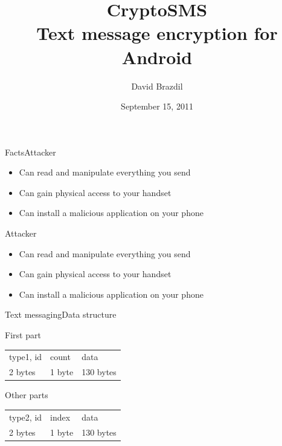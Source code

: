 \documentclass{beamer}
\title[CryptoSMS]{CryptoSMS\\Text message encryption for Android}
\author{David Brazdil}
\institute{University of Cambridge}
\date{September 15, 2011}
\newcommand{\txtFacts}{Facts}
\newcommand{\txtTextMessaging}{Text messaging}
\begin{document}
%

\begin{frame}
	\titlepage
\end{frame}


\begin{frame}{\txtFacts}{Attacker}
	\begin{itemize}
		\pause \item{Can read and manipulate everything you send}
		\pause \item{Can gain physical access to your handset}
		\pause \item{Can install a malicious application on your phone}
	\end{itemize}
\end{frame}



\begin{frame}{Attacker}
	\begin{itemize}
		\pause \item{Can read and manipulate everything you send}
		\pause \item{Can gain physical access to your handset}
		\pause \item{Can install a malicious application on your phone}
	\end{itemize}
\end{frame}

\begin{frame}{\txtTextMessaging}{Data structure}

   \begin{block}{First part}
	\begin{tabularx}{\textwidth}{ |l|l|L| }
		\hline
		type1, id  & count   & data \\
		2 bytes     & 1 byte  & 130 bytes  \\
		\hline
	\end{tabularx}
   \end{block}

   \begin{block}{Other parts}
	\begin{tabularx}{\textwidth}{ |l|l|L| }
		\hline
		type2, id  & index   & data \\
		2 bytes     & 1 byte  & 130 bytes  \\
		\hline
	\end{tabularx}
   \end{block}
\end{frame}
\end{document}
